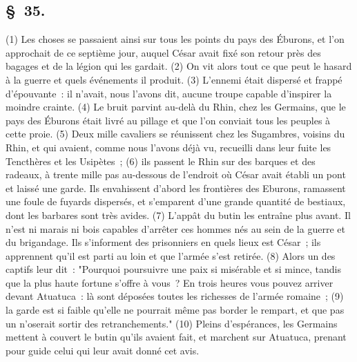 \documentclass[french,twoside]{book} %
\begin{document}
\subsection[{§ 35.}]{ \textsc{§ 35.} }
\noindent (1) Les choses se passaient ainsi sur tous les points du pays des Éburons, et l’on approchait de ce septième jour, auquel César avait fixé son retour près des bagages et de la légion qui les gardait. (2) On vit alors tout ce que peut le hasard à la guerre et quels événements il produit. (3) L'ennemi était dispersé et frappé d’épouvante : il n’avait, nous l’avons dit, aucune troupe capable d’inspirer la moindre crainte. (4) Le bruit parvint au-delà du Rhin, chez les Germains, que le pays des Éburons était livré au pillage et que l’on conviait tous les peuples à cette proie. (5) Deux mille cavaliers se réunissent chez les Sugambres, voisins du Rhin, et qui avaient, comme nous l’avons déjà vu, recueilli dans leur fuite les Tencthères et les Usipètes ; (6) ils passent le Rhin sur des barques et des radeaux, à trente mille pas au-dessous de l’endroit où César avait établi un pont et laissé une garde. Ils envahissent d’abord les frontières des Eburons, ramassent une foule de fuyards dispersés, et s’emparent d’une grande quantité de bestiaux, dont les barbares sont très avides. (7) L'appât du butin les entraîne plus avant. Il n’est ni marais ni bois capables d’arrêter ces hommes nés au sein de la guerre et du brigandage. Ils s’informent des prisonniers en quels lieux est César ; ils apprennent qu’il est parti au loin et que l’armée s’est retirée. (8) Alors un des captifs leur dit : "Pourquoi poursuivre une paix si misérable et si mince, tandis que la plus haute fortune s’offre à vous ? En trois heures vous pouvez arriver devant Atuatuca : là sont déposées toutes les richesses de l’armée romaine ; (9) la garde est si faible qu’elle ne pourrait même pas border le rempart, et que pas un n’oserait sortir des retranchements." (10) Pleins d’espérances, les Germains mettent à couvert le butin qu’ils avaient fait, et marchent sur Atuatuca, prenant pour guide celui qui leur avait donné cet avis.
\end{document}
